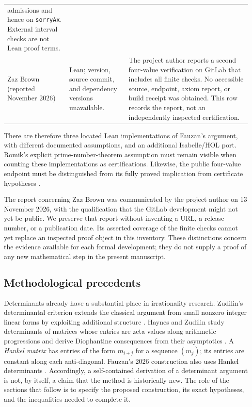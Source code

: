 \documentclass[11pt,letterpaper]{article}
\theoremstyle{definition}
\begin{document}
\begin{longtable}{@{}>{\raggedright\arraybackslash}p{}>{\raggedright\arraybackslash}p{}>{\raggedright\arraybackslash}p{}@{}}
admissions and hence on \texttt{sorryAx}.  External interval checks
are not Lean proof terms.\\
Zaz Brown (reported November 2026) & Lean; version, source commit,
and dependency versions unavailable. & The project author reports a
second four-value verification on GitLab that includes all finite
checks.  No accessible source, endpoint, axiom report, or build receipt
was obtained.  This row records the report, not an independently
inspected certification.\\
\end{longtable}
\endgroup

There are therefore three located Lean implementations of Fauzan's
argument, with different documented assumptions, and an additional
Isabelle/HOL port.  Romik's explicit prime-number-theorem assumption
must remain visible when counting these implementations as
certifications.  Likewise, the public four-value endpoint
must be distinguished from its fully proved implication from
certificate hypotheses \cite{davidson2026}.

The report concerning Zaz Brown was communicated by the project author
on 13 November 2026, with the qualification that the GitLab development
might not yet be public.  We preserve that report without inventing a
URL, a release number, or a publication date.  Its asserted coverage of
the finite checks cannot yet replace an inspected proof object in this
inventory.  These distinctions concern the evidence available for each
formal development; they do not supply a proof of any new mathematical
step in the present manuscript.

\subsection{Methodological precedents}

Determinants already have a substantial place in irrationality research.
Zudilin's determinantal criterion extends the classical argument from
small nonzero integer linear forms by exploiting additional structure
\cite{zudilin2017}.  Haynes and Zudilin study determinants of matrices
whose entries are zeta values along arithmetic progressions and derive
Diophantine consequences from their asymptotics \cite{hayneszudilin2015}.
A \emph{Hankel matrix} has entries of the form $m_{i+j}$ for a sequence
$(m_j)$; its entries are constant along each anti-diagonal.  Fauzan's
2026 construction also uses Hankel determinants \cite{fauzan2026}.
Accordingly, a self-contained derivation of a determinant argument is
not, by itself, a claim that the method is historically new.  The role
of the sections that follow is to specify the proposed construction,
its exact hypotheses, and the inequalities needed to complete it.
\end{document}
